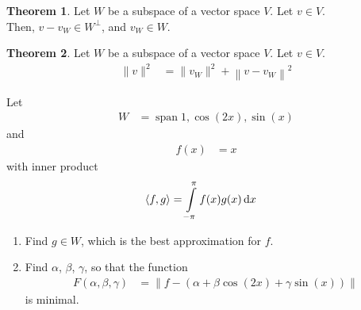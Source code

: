 \documentclass[fleqn, a4paper, 12pt, twoside]{article}
\theoremstyle{definition}
\theoremstyle{theorem}
\newtheorem{theorem}{Theorem}
\DeclareMathOperator{\setspan}{span}
\begin{document}
\begin{theorem}
	Let $W$ be a subspace of a vector space $V$.
	Let $v \in V$.\\
	Then, $v - v_W \in W^{\perp}$, and $v_W \in W$.
\end{theorem}

\begin{theorem}
	Let $W$ be a subspace of a vector space $V$.
	Let $v \in V$.\\
	\begin{align*}
		\|v\|^2 & = \|v_W\|^2 + \left\| v - v_W \right\|^2
	\end{align*}
\end{theorem}

\begin{question}
	Let
	\begin{align*}
		W & = \setspan{1,\cos(2 x),\sin(x)}
	\end{align*}
	and
	\begin{align*}
		f(x) & = x
	\end{align*}
	with inner product
	\begin{align*}
		\langle f,g \rangle & = \int\limits_{-\pi}^{\pi} f(x) g(x) \dif x
	\end{align*}
	\begin{enumerate}
		\item
			Find $g \in W$, which is the best approximation for $f$.
		\item
			Find $\alpha$, $\beta$, $\gamma$, so that the function
			\begin{align*}
				F(\alpha,\beta,\gamma) & = \left\| f- \left( \alpha + \beta \cos(2 x) + \gamma \sin(x) \right) \right\|
			\end{align*}
			is minimal.
	\end{enumerate}
\end{question}
\end{document}
